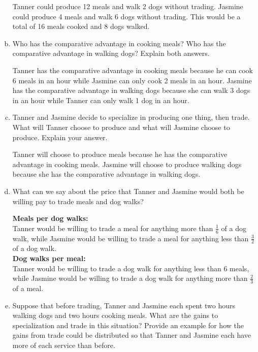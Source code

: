 \documentclass{article}
\begin{document}
\begin{enumerate}[(a)]

        Tanner could produce 12 meals and walk 2 dogs without trading. Jasmine could produce 4 meals and walk 6 dogs without trading. This would be a total of 16 meals cooked and 8 dogs walked.
\pagebreak
    \item Who has the comparative advantage in cooking meals? Who
has the comparative advantage in walking dogs? Explain both
answers.

    Tanner has the comparative advantage in cooking meals because he can cook 6 meals in an hour while Jasmine can only cook 2 meals in an hour. Jasmine has the comparative advantage in walking dogs because she can walk 3 dogs in an hour while Tanner can only walk 1 dog in an hour.

    \item Tanner and Jasmine decide to specialize in producing one thing,
then trade. What will Tanner choose to produce and what will
Jasmine choose to produce. Explain your answer.

    Tanner will choose to produce meals because he has the comparative advantage in cooking meals. Jasmine will choose to produce walking dogs because she has the comparative advantage in walking dogs.

    \item What can we say about the price that Tanner and Jasmine would
both be willing pay to trade meals and dog walks?

    \textbf{Meals per dog walks:}\\
    Tanner would be willing to trade a meal for anything more than \(\frac{1}{6}\) of a dog walk, while Jasmine would be willing to trade a meal for anything less than \(\frac{3}{2}\) of a dog walk.\\

    \textbf{Dog walks per meal:}\\
    Tanner would be willing to trade a dog walk for anything less than 6 meals, while Jasmine would be willing to trade a dog walk for anything more than \(\frac{2}{3}\) of a meal.

    \item Suppose that before trading, Tanner and Jasmine each spent two
hours walking dogs and two hours cooking meals. What are the
gains to specialization and trade in this situation? Provide an
example for how the gains from trade could be distributed so
that Tanner and Jasmine each have more of each service than
before.


\end{enumerate}
\end{document}
